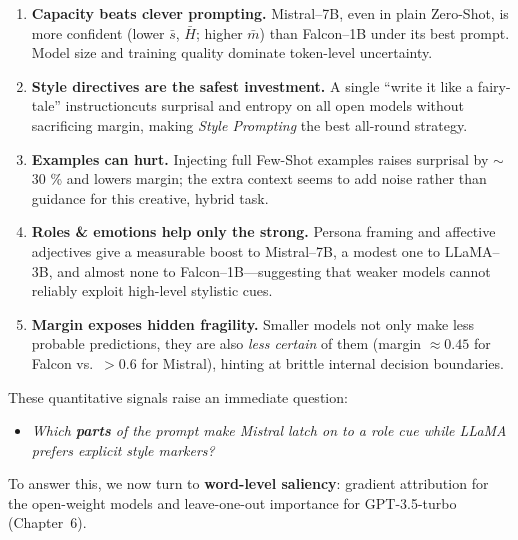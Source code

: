 \documentclass[12pt]{article}
\begin{document}
\begin{enumerate}[]
    \item \textbf{Capacity beats clever prompting.}  
          Mistral–7B, even in plain Zero-Shot, is more confident
          (lower $\bar s$, $\bar H$; higher $\bar m$) than Falcon–1B under its best prompt.  
          Model size and training quality dominate token-level uncertainty.

    \item \textbf{Style directives are the safest investment.}  
          A single “write it like a fairy-tale” instruction\nolinebreak[4] cuts surprisal and entropy
          on all open models without sacrificing margin, making \emph{Style Prompting}
          the best all-round strategy.

    \item \textbf{Examples can hurt.}  
          Injecting full Few-Shot examples raises surprisal by $\sim$30 \%
          and lowers margin; the extra context seems to add noise rather than guidance
          for this creative, hybrid task.

    \item \textbf{Roles \& emotions help only the strong.}  
          Persona framing and affective adjectives give a
          measurable boost to Mistral–7B,
          a modest one to LLaMA–3B,
          and almost none to Falcon–1B—suggesting that weaker models
          cannot reliably exploit high-level stylistic cues.

    \item \textbf{Margin exposes hidden fragility.}  
          Smaller models not only make less probable predictions,
          they are also \emph{less certain} of them
          (margin $\approx{}0.45$ for Falcon vs.\ $>0.6$ for Mistral),
          hinting at brittle internal decision boundaries.
\end{enumerate}

\bigskip
\noindent
These quantitative signals raise an immediate question:

\begin{itemize}
    \item \emph{Which \textbf{parts} of the prompt
          make Mistral latch on to a role cue
          while LLaMA prefers explicit style markers?}
\end{itemize}

To answer this, we now turn to \textbf{word-level saliency}:
gradient attribution for the open-weight models
and leave-one-out importance for GPT-3.5-turbo (Chapter~6).
\end{document}
